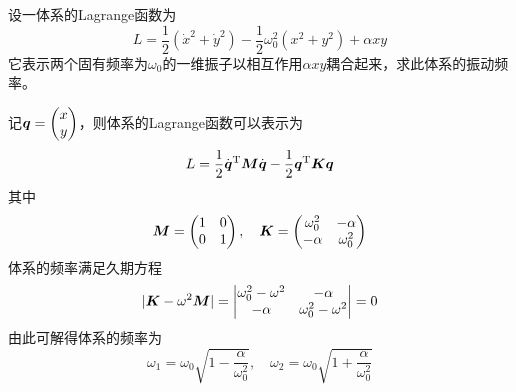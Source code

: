\begin{question}
设一体系的Lagrange函数为
\begin{equation*}
	L = \frac12 (\dot{x}^2+\dot{y}^2) - \frac12 \omega_0^2 (x^2+y^2) + \alpha xy
\end{equation*}
它表示两个固有频率为$\omega_0$的一维振子以相互作用$\alpha xy$耦合起来，求此体系的振动频率。
\end{question}
\begin{solution}
记$\boldsymbol{q} = \begin{pmatrix} x \\ y \end{pmatrix}$，则体系的Lagrange函数可以表示为
\begin{equation*}
	L = \frac12 \dot{\boldsymbol{q}}^{\mathrm{T}} \boldsymbol{M} \dot{\boldsymbol{\boldsymbol{q}}} - \frac12 \boldsymbol{q}^{\mathrm{T}} \boldsymbol{K} \boldsymbol{q}
\end{equation*}
其中
\begin{equation*}
	\boldsymbol{M} = \begin{pmatrix} 1 & 0 \\ 0 & 1 \end{pmatrix},\quad \boldsymbol{K} = \begin{pmatrix} \omega_0^2 & -\alpha \\ -\alpha & \omega_0^2 \end{pmatrix}
\end{equation*}
体系的频率满足久期方程
\begin{equation*}
	|\boldsymbol{K}-\omega^2 \boldsymbol{M}| = \begin{vmatrix} \omega_0^2-\omega^2 & -\alpha \\ -\alpha & \omega_0^2-\omega^2 \end{vmatrix} = 0
\end{equation*}
由此可解得体系的频率为
\begin{equation*}
	\omega_1 = \omega_0 \sqrt{1-\frac{\alpha}{\omega_0^2}},\quad \omega_2 = \omega_0 \sqrt{1+\frac{\alpha}{\omega_0^2}}
\end{equation*}
\end{solution}

